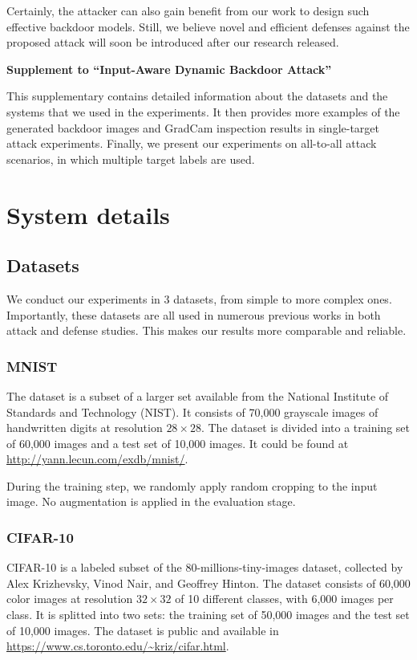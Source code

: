 Certainly, the attacker can also gain benefit from our work to design such effective backdoor models. Still, we believe novel and efficient defenses against the proposed attack will soon be introduced after our research released.

\medskip

\small




\newpage
\normalsize

\appendix
\begin{center}
\textbf{\Large{Supplement to ``Input-Aware Dynamic Backdoor Attack''}}
\end{center}

This supplementary contains detailed information about the datasets and the systems that we used in the experiments. It then provides more examples of the generated backdoor images and GradCam inspection results in single-target attack experiments. Finally, we present our experiments on all-to-all attack scenarios, in which multiple target labels are used.
\section{System details}
\subsection{Datasets}
    We conduct our experiments in 3 datasets, from simple to more complex ones. Importantly, these datasets are all used in numerous previous works in both attack and defense studies. This makes our results more comparable and reliable.
\subsubsection{MNIST} The dataset \cite{lecun1998gradient} is a subset of a larger set available from the National Institute of Standards and Technology (NIST). It consists of 70,000 grayscale images of handwritten digits at resolution $28 \times 28$. The dataset is divided into a training set of 60,000 images and a test set of 10,000 images. It could be found at \url{http://yann.lecun.com/exdb/mnist/}.

During the training step, we randomly apply random cropping to the input image. No augmentation is applied in the evaluation stage.
\subsubsection{CIFAR-10}
CIFAR-10 \cite{krizhevsky2009learning} is a labeled subset of the 80-millions-tiny-images dataset, collected by Alex Krizhevsky, Vinod Nair, and Geoffrey Hinton. The dataset consists of 60,000 color images at resolution $32 \times 32$ of 10 different classes, with 6,000 images per class. It is splitted into two sets: the training set of 50,000 images and the test set of 10,000 images. The dataset is public and available in \url{https://www.cs.toronto.edu/~kriz/cifar.html}.

